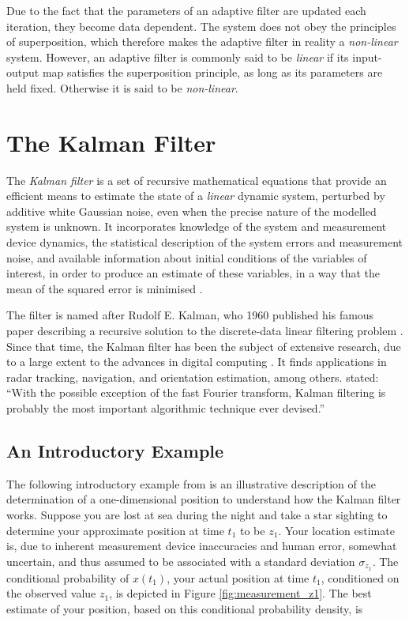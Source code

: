 Due to the fact that the parameters of an adaptive filter are updated each iteration, they become data dependent. The system does not obey the principles of superposition, which therefore makes the adaptive filter in reality a \emph{non-linear} system. However, an adaptive filter is commonly said to be \emph{linear} if its input-output map satisfies the superposition principle, as long as its parameters are held fixed. Otherwise it is said to be \emph{non-linear}.

\section{The Kalman Filter}

The \emph{Kalman filter} is a set of recursive mathematical equations that provide an efficient means to estimate the state of a \emph{linear} dynamic system, perturbed by additive white Gaussian noise, even when the precise nature of the modelled system is unknown. It incorporates knowledge of the system and measurement device dynamics, the statistical description of the system errors and measurement noise, and available information about initial conditions of the variables of interest, in order to produce an estimate of these variables, in a way that the mean of the squared error is minimised \cite{Maybeck79}. 

The filter is named after Rudolf E. Kalman, who 1960 published his famous paper describing a recursive solution to the discrete-data linear filtering problem \cite{kalman_1960}. Since that time, the Kalman filter has been the subject of extensive research, due to a large extent to the advances in digital computing \cite{welch2014}. It finds applications in radar tracking, navigation, and orientation estimation, among others. \citeauthor{zarchan2009fundamentals} \cite{zarchan2009fundamentals} stated: ``With the possible exception of the fast Fourier transform, Kalman filtering is probably the most important algorithmic technique ever devised.''

\subsection{An Introductory Example}

The following introductory example from \citeauthor{Maybeck79} \cite{Maybeck79} is an illustrative description of the determination of a one-dimensional position to understand how the Kalman filter works. Suppose you are lost at sea during the night and take a star sighting to determine your approximate position at time $t_1$ to be $z_1$. Your location estimate is, due to inherent measurement device inaccuracies and human error, somewhat uncertain, and thus assumed to be associated with a standard deviation $\sigma_{z_1}$. The conditional probability of $x(t_1)$, your actual position at time $t_1$, conditioned on the observed value $z_1$, is depicted in Figure \ref{fig:measurement_z1}. The best estimate of your position, based on this conditional probability density, is

